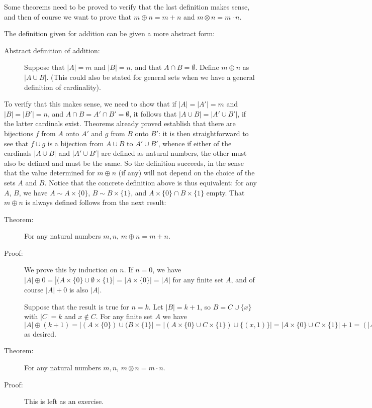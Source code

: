 \documentclass[12pt]{book}
\begin{document}
Some theorems need to be proved to verify that the last definition makes sense, and then of course we want to prove that $m \oplus n = m+n$ and $m \otimes n = m \cdot n$.

The definition given for addition can be given a more abstract form:

\begin{description}

\item[Abstract definition of addition:]  Suppose that $|A|=m$ and $|B|=n$, and that $A \cap B = \emptyset$.  Define $m \oplus n$ as $|A \cup B|$.  (This could also be stated for general sets when we have a general definition of cardinality). 

\end{description}

To verify that this makes sense, we need to show that if $|A| = |A'| = m$ and $|B| = |B'|=n$, and $A \cap B = A'\cap B' = \emptyset$, it follows that $|A \cup B| = |A' \cup B'|$, if the latter cardinals exist.
Theorems already proved establish that there are bijections $f$ from $A$ onto $A'$ and $g$ from $B$ onto $B'$:  it is then straightforward to see that $f \cup g$ is a bijection from $A \cup B$ to $A' \cup B'$, whence if either of the cardinals $|A \cup B|$ and $|A' \cup B'|$ are defined as natural numbers, the other must also be defined and must be the same.  So the definition succeeds, in the sense that the value determined for $m \oplus n$ (if any) will not depend on the choice of the sets $A$ and $B$.  Notice that the concrete definition above is thus equivalent:  for any $A$, $B$, we have $A \sim A \times \{0\}$, $B \sim B \times \{1\}$, and $A \times \{0\} \cap B \times \{1\}$ empty.  That $m \oplus n$ is always defined follows from the next result:

\begin{description}

\item[Theorem:]  For any natural numbers $m,n$, $m \oplus n = m + n$.

\item[Proof:]  We prove this by induction on $n$.  If $n=0$, we have $|A|\oplus 0 = |(A \times \{0\} \cup \emptyset\times \{1\}| =  |A \times \{0\}| = |A|$ for any finite set $A$, and of course
$|A|+0$ is also $|A|$.

Suppose that the result is true for $n=k$.  Let $|B|=k+1$, so $B = C \cup \{x\}$ with $|C|=k$ and $x \not\in C$.  For any finite set $A$ we have
$|A| \oplus (k+1) = |(A \times \{0\}) \cup (B \times \{1\}| = |(A \times \{0\} \cup C \times \{1\}) \cup \{(x,1)\}| = |A \times \{0\} \cup C \times \{1\}|+1 = (|A| \oplus |C|)+1=(|A|\oplus k)+1) = (|A| +k)+1) = |A|+(k+1)$ as desired.

\item[Theorem:]  For any natural numbers $m,n$, $m \otimes n = m \cdot n$.

\item[Proof:]  This is left as an exercise.

\end{description}
\end{document}

